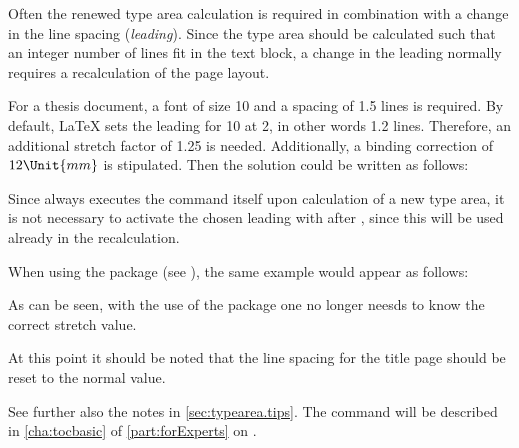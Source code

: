 Often the renewed type area calculation is required in combination
with a change in the line spacing
(\emph{leading}). Since the type area should be
calculated such that an integer number of lines fit in the text block,
a change in the leading normally requires a recalculation of the page
layout.
 
\begin{Example}
  For a thesis document, a font of size 10 and a spacing of
  1.5 lines is required. By default, {\LaTeX} sets the leading for
  10 at 2, in other words 1.2 lines. Therefore, an
  additional stretch factor of 1.25 is needed. Additionally, a binding
  correction of \(12\Unit{mm}\) is stipulated. Then the solution could be
  written as follows:
Since  always executes the command
 itself upon calculation of a new type area, it is
not necessary to activate the chosen leading with 
after , since this will be used already in the
recalculation.

When using the  package (see
\cite{package:setspace}), the same example would appear as follows:
As can be seen, with the use of the  package one no
longer neesds to know the correct stretch value.

At this point it should be noted that the line spacing for the title
page should be reset to the normal value.
\iffalse%
  A complete example would be:
\fi
{}
  See further also the notes in \autoref{sec:typearea.tips}. The command
   will be described in
  \autoref{cha:tocbasic} of \autoref{part:forExperts} on
  .
\end{Example}

